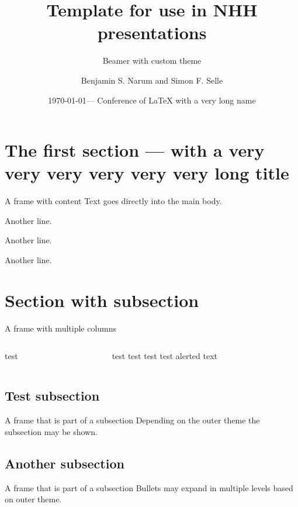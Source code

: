 \documentclass[compress]{beamer}
\title[NHH Template]{Template for use in NHH presentations}
\subtitle[]{Beamer with custom theme}
\author[Narum and Selle]{Benjamin S. Narum and Simon F. Selle}
\institute[NHH]{NHH Norwegian School of Economics}
\date[\year]{\today ---{} Conference of \LaTeX{} with a very long name}
\begin{document}
\section[First section]{The first section ---{} with a very very very very very very long title}

\begin{frame}{A frame with content}
	Text goes directly into the main body.
	
	\vspace{1em}

	Another line.
	
	\vspace{1em}

	Another line.

	\vspace{1em}

	Another line.
\end{frame}

\section{Section with subsection}

\begin{frame}{A frame with multiple columns}

\begin{columns}
\begin{column}{0.49\textwidth}
test
\end{column}
\colsep{}
\begin{column}{0.49\textwidth}
test
\vspace{1em}
test
\vspace{1em}
test
\vspace{1em}
test
\vspace{1em}
\alert{alerted text}
\end{column}
\end{columns}
\end{frame}

\subsection{Test subsection}
\begin{frame}{A frame that is part of a subsection}
	Depending on the outer theme the subsection may be shown.
\end{frame}

\subsection{Another subsection}
\begin{frame}{A frame that is part of a subsection}
	Bullets may expand in multiple levels based on outer theme.
\end{frame}
\end{document}
